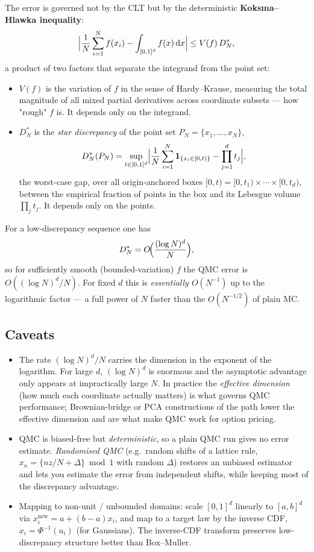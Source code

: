 \documentclass[11pt]{article}
\newcommand{\dd}{\,\mathrm{d}}
\begin{document}
The error is governed not by the CLT but by the deterministic \textbf{Koksma--Hlawka
inequality}:
\[
\Bigl|\frac1N\sum_{i=1}^N f(x_i)-\int_{[0,1]^d}f(x)\dd x\Bigr|\le V(f)\,D_N^\ast,
\]
a product of two factors that separate the integrand from the point set:
\begin{itemize}[leftmargin=2em]
\item $V(f)$ is the variation of $f$ in the sense of Hardy--Krause, measuring the
total magnitude of all mixed partial derivatives across coordinate subsets --- how
"rough" $f$ is. It depends only on the integrand.
\item $D_N^\ast$ is the \emph{star discrepancy} of the point set
$P_N=\{x_1,\dots,x_N\}$,
\[
D_N^\ast(P_N)=\sup_{t\in[0,1]^d}\Bigl|\frac1N\sum_{i=1}^N
\mathbf 1_{\{x_i\in[0,t)\}}-\prod_{j=1}^d t_j\Bigr|,
\]
the worst-case gap, over all origin-anchored boxes $[0,t)=[0,t_1)\times\cdots\times
[0,t_d)$, between the empirical fraction of points in the box and its Lebesgue volume
$\prod_j t_j$. It depends only on the points.
\end{itemize}
For a low-discrepancy sequence one has
\[
D_N^\ast=O\!\Bigl(\frac{(\log N)^d}{N}\Bigr),
\]
so for sufficiently smooth (bounded-variation) $f$ the QMC error is
$O((\log N)^d/N)$. For fixed $d$ this is \emph{essentially $O(N^{-1})$} up to the
logarithmic factor --- a full power of $N$ faster than the $O(N^{-1/2})$ of plain MC.

\subsection{Caveats}

\begin{itemize}[leftmargin=2em]
\item The rate $(\log N)^d/N$ carries the dimension in the exponent of the logarithm.
For large $d$, $(\log N)^d$ is enormous and the asymptotic advantage only appears at
impractically large $N$. In practice the \emph{effective dimension} (how much each
coordinate actually matters) is what governs QMC performance; Brownian-bridge or PCA
constructions of the path lower the effective dimension and are what make QMC work for
option pricing.
\item QMC is biased-free but \emph{deterministic}, so a plain QMC run gives no error
estimate. \emph{Randomised QMC} (e.g.\ random shifts of a lattice rule,
$x_n=\{nz/N+\Delta\}\bmod 1$ with random $\Delta$) restores an unbiased estimator and
lets you estimate the error from independent shifts, while keeping most of the
discrepancy advantage.
\item Mapping to non-unit / unbounded domains: scale $[0,1]^d$ linearly to
$[a,b]^d$ via $x^{\text{new}}_i=a+(b-a)x_i$, and map to a target law by the inverse CDF,
$x_i=\Phi^{-1}(u_i)$ (for Gaussians). The inverse-CDF transform preserves
low-discrepancy structure better than Box--Muller.
\end{itemize}
\end{document}
